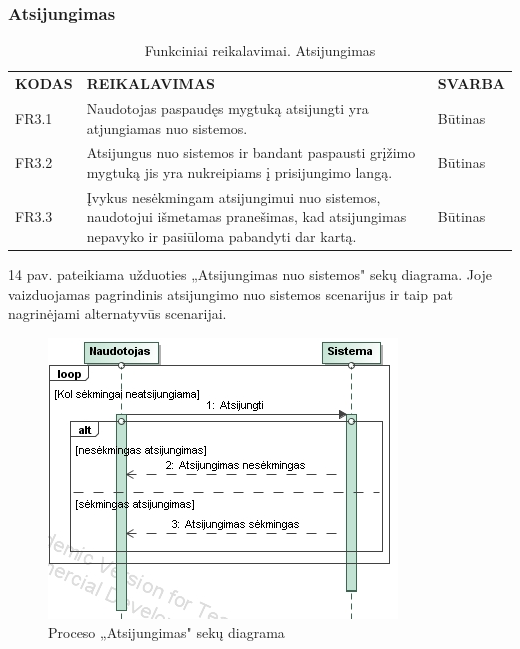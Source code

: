 \documentclass{VUMIFPSkursinis}
\begin{document}
\subsubsection{Atsijungimas}
\begin{table}[H]
\caption{Funkciniai reikalavimai. Atsijungimas}
\centering
\normalsize
\begin{tabular}{|p{2cm}|p{10cm}|p{3cm}|}
\hline
\rowcolor{gray!30}
\multicolumn{3}{|l|}{\textbf{3. Atsijungimas}} \\ \hline
\textbf{KODAS}& \multicolumn{1}{m{10cm}|}{\textbf{REIKALAVIMAS}} & \textbf{SVARBA} \\ \hline
FR3.1 & \multicolumn{1}{m{10cm}|}{Naudotojas paspaudęs mygtuką atsijungti yra atjungiamas nuo sistemos.} & Būtinas \\ \hline
FR3.2 & \multicolumn{1}{m{10cm}|}{Atsijungus nuo sistemos ir bandant paspausti grįžimo mygtuką jis yra nukreipiams į prisijungimo langą.} & Būtinas \\ \hline
FR3.3 & \multicolumn{1}{m{10cm}|}{Įvykus nesėkmingam atsijungimui nuo sistemos, naudotojui išmetamas pranešimas, kad atsijungimas nepavyko ir pasiūloma pabandyti dar kartą.} & Būtinas \\ \hline
\end{tabular}
\end{table}
14 pav. pateikiama užduoties „Atsijungimas nuo sistemos" sekų diagrama. Joje vaizduojamas pagrindinis atsijungimo nuo sistemos scenarijus ir taip pat nagrinėjami alternatyvūs scenarijai.
\begin{figure}[H]
\centering
\includegraphics[scale=1, frame]{img/atsijungimas.png}
\caption{Proceso „Atsijungimas" sekų diagrama}
\end{figure}
\end{document}
